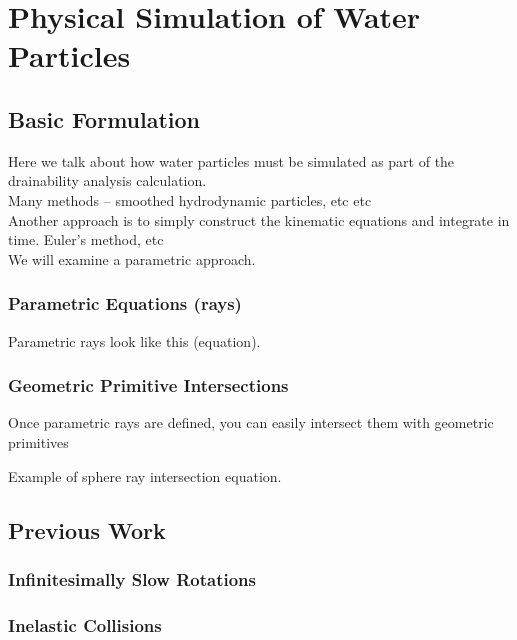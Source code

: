 						\chapter{Physical Simulation of Water Particles}

\section{Basic Formulation}

Here we talk about how water particles must be simulated as part of the drainability analysis calculation.
\\

Many methods -- smoothed hydrodynamic particles, etc etc
\\

Another approach is to simply construct the kinematic equations and integrate in time. Euler's method, etc
\\

We will examine a parametric approach.
\\

	\subsection{Parametric Equations (rays)}

Parametric rays look like this (equation).


	\subsection{Geometric Primitive Intersections}

Once parametric rays are defined, you can easily intersect them with geometric primitives

Example of sphere ray intersection equation.




\section{Previous Work}

	\subsection{Infinitesimally Slow Rotations}

	\subsection{Inelastic Collisions}

